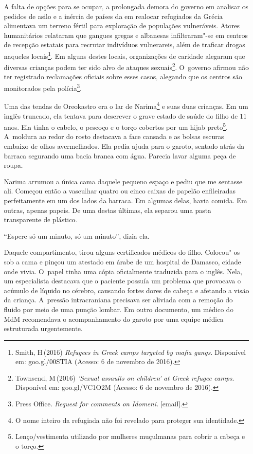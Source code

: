 A falta de opções para se ocupar, a prolongada demora do governo em
analisar os pedidos de asilo e a inércia de países da  em realocar
refugiados da Grécia alimentava um terreno fértil para exploração de
populações vulneráveis. Atores humanitários relataram que gangues gregas
e albanesas infiltraram"-se em centros de recepção estatais para recrutar
indivíduos vulnerareis, além de traficar drogas naqueles
locais\footnote{ Smith, H\,(2016) \emph{Refugees in Greek camps
targeted by mafia gangs}. Disponível em:
goo.gl/00STIA
(Acesso: 6 de novembro de 2016).}. Em alguns destes locais, organizações de
caridade alegaram que diversas crianças podem ter sido alvo de ataques
sexuais\footnote{ Townsend, M\,(2016) \emph{'Sexual assaults on
children' at Greek refugee camps}. Disponível em:
goo.gl/VC1O2M
(Acesso: 6 de novembro de 2016).}. O~governo afirmou não ter registrado
reclamações oficiais sobre esses casos, alegando que os centros são
monitorados pela polícia\footnote{ Press Office. \emph{Request for comments on
Idomeni}\emph{.} {[}email{]}.}.

Uma das tendas de Oreokastro era o lar de Narima\footnote{ O nome inteiro da refugiada não foi revelado para
proteger sua identidade.}  e
suas duas crianças. Em um inglês truncado, ela tentava para descrever o
grave estado de saúde do filho de 11 anos. Ela tinha o cabelo, o pescoço
e o torço cobertos por um hijab preto\footnote{ Lenço/vestimenta utilizado por mulheres
muçulmanas para cobrir a cabeça e o torço.}. A~moldura
ao redor do rosto destacava a face cansada e as bolsas escuras embaixo
de olhos avermelhados. Ela pedia ajuda para o garoto, sentado atrás da
barraca segurando uma bacia branca com água. Parecia lavar alguma peça
de roupa.

Narima arrumou a única cama daquele pequeno espaço e pediu que me
sentasse ali. Começou então a vasculhar quatro ou cinco caixas de
papelão enfileiradas perfeitamente em um dos lados da barraca. Em
algumas delas, havia comida. Em outras, apenas papeis. De uma destas
últimas, ela separou uma pasta transparente de plástico.

``Espere só um minuto, só um minuto'', dizia ela.

Daquele compartimento, tirou alguns certificados médicos do filho.
Colocou"-os sob a cama e pinçou um atestado em árabe de um hospital de
Damasco, cidade onde vivia. O~papel tinha uma cópia oficialmente
traduzida para o inglês. Nela, um especialista destacava que o paciente
possuía um problema que provocava o acúmulo de líquido no cérebro,
causando fortes dores de cabeça e afetando a visão da criança. A~pressão
intracraniana precisava ser aliviada com a remoção do fluido por meio de
uma punção lombar. Em outro documento, um médico do MdM recomendava o
acompanhamento do garoto por uma equipe médica estruturada urgentemente.

